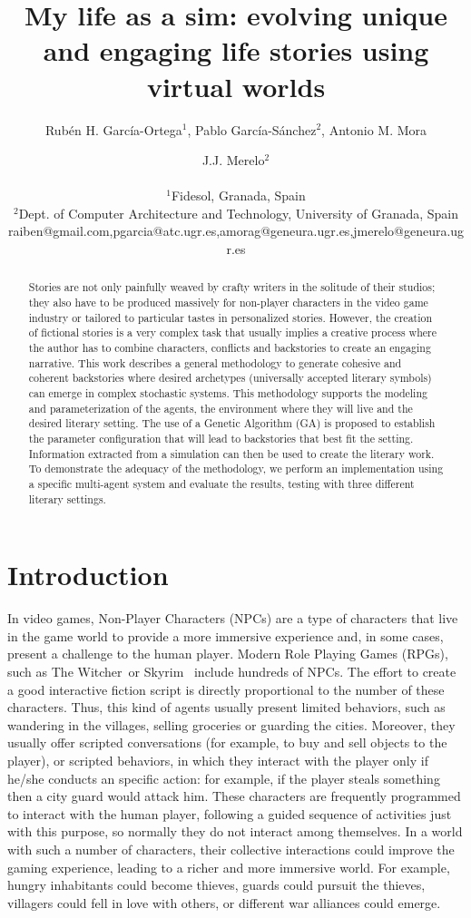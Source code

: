 \documentclass[letterpaper]{article}
\title{My life as a sim: evolving unique and engaging life stories using virtual worlds}
\author{Rub\'en H. Garc\'ia-Ortega$^{1}$, Pablo Garc\'ia-S\'anchez$^{2}$, Antonio M. Mora \and J.J. Merelo$^2$ \\
\mbox{}\\
$^1$Fidesol, Granada, Spain \\
$^2$Dept. of Computer Architecture and Technology, University of Granada, Spain \\
raiben@gmail.com,pgarcia@atc.ugr.es,amorag@geneura.ugr.es,jmerelo@geneura.ugr.es}
\begin{document}
\maketitle

\begin{abstract}
Stories are not only painfully weaved by crafty writers in the
solitude of their studios; they also have to be produced massively for
non-player characters in the video game industry or tailored to
particular tastes in personalized stories. However, the creation of
fictional stories is a very complex task that usually implies a
creative process where the author has to combine characters, 
conflicts and backstories to create an engaging narrative.
This work describes a general methodology to generate cohesive and coherent
backstories where desired archetypes (universally accepted literary symbols) can emerge in complex stochastic systems.
This methodology supports the modeling and parameterization of the agents, the environment where they will live and the desired literary setting. The use of a Genetic Algorithm (GA) is proposed to establish the parameter configuration that will lead to backstories that best fit the setting. Information extracted from a simulation can then be used to create the literary work.
To demonstrate the adequacy of the methodology, we perform an implementation using a specific multi-agent system and evaluate the results, testing with three different literary settings.
\end{abstract}


\section{Introduction}

In video games, Non-Player Characters (NPCs)  are a type of characters
that live in the game world to provide a more immersive
experience and, in some cases, present a challenge to the human player. Modern  Role Playing Games (RPGs), such as The
Witcher\texttrademark~or Skyrim\texttrademark~ include hundreds of NPCs. The effort to create a good interactive fiction script is directly proportional to the number of these characters. Thus, this kind of agents usually present limited behaviors, such as wandering in the villages, selling groceries or guarding the cities. Moreover, they usually offer scripted conversations (for example, to buy and sell objects to the player), or scripted behaviors, in which they interact with the player only if he/she conducts an specific action: for example, if the player steals something then a city guard would attack him. These characters are frequently programmed to interact with the human player, following a guided sequence of activities just with this purpose, so normally they do not interact among themselves. In a world with such a number of characters, their collective interactions could improve the gaming experience, leading to a richer and more immersive world. For example, hungry inhabitants could become thieves, guards could pursuit the thieves, villagers could fell in love with others, or different war alliances could emerge.
\end{document}
